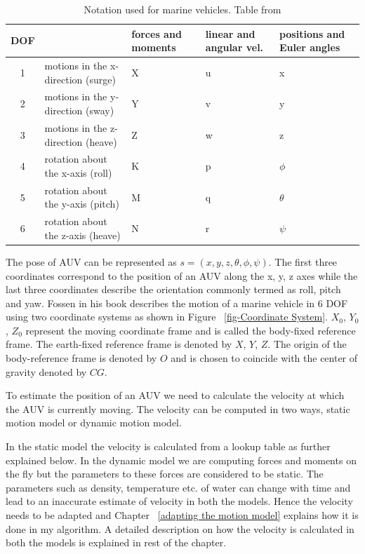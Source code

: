 \documentclass[12pt]{dalcsthesis}
\begin{document}
\begin{table}[tbh]
\centering
\label{marine notation}
\begin{tabular}{|c|>{\centering}p{3cm}|>{\centering}p{3cm}|>{\centering}p{3cm}|>{\centering}p{3cm}|}
\hline 
DOF &  & forces and moments & linear and angular vel. & positions and Euler angles\tabularnewline
\hline 
\hline 
1 & motions in the x-direction (surge) & X & u & x\tabularnewline
\hline 
2 & motions in the y-direction (sway) & Y & v & y\tabularnewline
\hline 
3 & motions in the z-direction (heave) & Z & w & z\tabularnewline
\hline 
4 & rotation about the x-axis (roll) & K & p & $\phi$\tabularnewline
\hline 
5 & rotation about the y-axis (pitch) & M & q & $\theta$\tabularnewline
\hline 
6 & rotation about the z-axis (heave) & N & r & $\psi$\tabularnewline
\hline 
\end{tabular}
\caption{Notation used for marine vehicles. Table from \cite{Thor}}
\end{table}

The pose of AUV can be represented as $s=(x,y,z,\theta,\phi,\psi)$. The first three coordinates correspond to the position of an AUV along the x, y, z axes while the last three coordinates describe the orientation commonly termed as roll, pitch and yaw. Fossen \cite{Thor} in his book describes the motion of a marine vehicle in 6 DOF using two coordinate systems as shown in Figure ~\ref{fig-Coordinate System}. $X_0$, $Y_0$, $Z_0$ represent the moving coordinate frame and is called the body-fixed reference frame. The earth-fixed reference frame is denoted by $X$, $Y$, $Z$. The origin of the body-reference frame is denoted by $O$ and is chosen to coincide with the center of gravity denoted by $CG$.  

To estimate the position of an AUV we need to calculate the velocity at which the AUV is currently moving. The velocity can be computed in two ways, static motion model or dynamic motion model.

In the static model the velocity is calculated from a lookup table as further explained below. In the dynamic model we are computing forces and moments on the fly but the parameters to these forces are considered to be static. The parameters such as density, temperature etc. of water can change with time and lead to an inaccurate estimate of velocity in both the models. Hence the velocity needs to be adapted and Chapter ~\ref{adapting the motion model} explains how it is done in my algorithm. A detailed description on how the velocity is calculated in both the models is explained in rest of the chapter.
\end{document}
